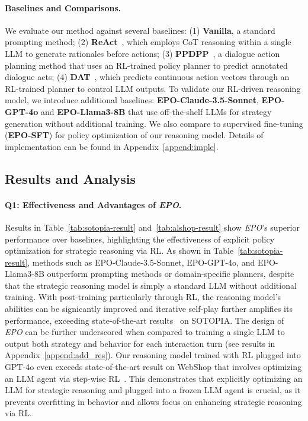 \paragraph{\textbf{Baselines and Comparisons.}}  
We evaluate our method against several baselines:  
(1) \textbf{Vanilla}, a standard prompting method;  
(2) \textbf{ReAct}~\cite{yao2023react}, which employs CoT reasoning within a single LLM to generate rationales before actions;  
(3) \textbf{PPDPP}~\cite{deng2023plug}, a dialogue action planning method that uses an RL-trained policy planner to predict annotated dialogue acts; 
(4) \textbf{DAT}~\cite{li2024dialogue}, which predicts continuous action vectors through an RL-trained planner to control LLM outputs.  
To validate our RL-driven reasoning model, we introduce additional baselines: \textbf{EPO-Claude-3.5-Sonnet}, \textbf{EPO-GPT-4o} and \textbf{EPO-Llama3-8B} that use off-the-shelf LLMs for strategy generation without additional training.
We also compare to supervised fine-tuning (\textbf{EPO-SFT}) for policy optimization of our reasoning model. Details of implementation can be found in Appendix~\ref{append:imple}.




\subsection{Results and Analysis}

\paragraph{\textbf{Q1: Effectiveness and Advantages of \textit{EPO}.}}
Results in Table~\ref{tab:sotopia-result} and~\ref{tab:alshop-result} show \textit{EPO}'s superior performance over baselines, highlighting the effectiveness of explicit policy optimization for strategic reasoning via RL.
As shown in Table~\ref{tab:sotopia-result}, methods such as EPO-Claude-3.5-Sonnet, EPO-GPT-4o, and EPO-Llama3-8B outperform prompting methods or domain-specific planners, despite that the strategic reasoning model is simply a standard LLM without additional training.
With post-training particularly through RL, the reasoning model's abilities can be signicantly improved and iterative self-play further amplifies its performance, exceeding state-of-the-art results~\cite{zhang2024k} on SOTOPIA.
The design of \textit{EPO} can be further underscored when compared to training a single LLM to output both strategy and behavior for each interaction turn (see results in Appendix~\ref{append:add_res}). Our reasoning model trained with RL plugged into GPT-4o even exceeds state-of-the-art result on WebShop that involves optimizing an LLM agent via step-wise RL~\cite{Deng2024FromNT}. This demonstrates that explicitly optimizing an LLM for strategic reasoning and plugged into a frozen LLM agent is crucial, as it prevents overfitting in behavior and allows focus on enhancing strategic reasoning via RL.

